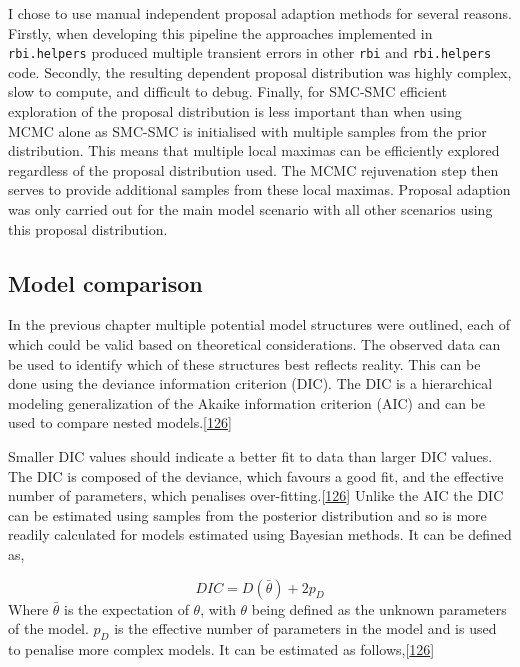 \documentclass[11pt,twoside]{bristolthesis}
\begin{document}
  I chose to use manual independent proposal adaption methods for several reasons. Firstly, when developing this pipeline the approaches implemented in \texttt{rbi.helpers} produced multiple transient errors in other \texttt{rbi} and \texttt{rbi.helpers} code. Secondly, the resulting dependent proposal distribution was highly complex, slow to compute, and difficult to debug. Finally, for SMC-SMC efficient exploration of the proposal distribution is less important than when using MCMC alone as SMC-SMC is initialised with multiple samples from the prior distribution. This means that multiple local maximas can be efficiently explored regardless of the proposal distribution used. The MCMC rejuvenation step then serves to provide additional samples from these local maximas. Proposal adaption was only carried out for the main model scenario with all other scenarios using this proposal distribution.
  
  \hypertarget{model-comparison}{%
  \subsection{Model comparison}\label{model-comparison}}
  
  In the previous chapter multiple potential model structures were outlined, each of which could be valid based on theoretical considerations. The observed data can be used to identify which of these structures best reflects reality. This can be done using the deviance information criterion (DIC). The DIC is a hierarchical modeling generalization of the Akaike information criterion (AIC) and can be used to compare nested models.{[}\protect\hyperlink{ref-Gelman:nll_LBlw}{126}{]}
  
  Smaller DIC values should indicate a better fit to data than larger DIC values. The DIC is composed of the deviance, which favours a good fit, and the effective number of parameters, which penalises over-fitting.{[}\protect\hyperlink{ref-Gelman:nll_LBlw}{126}{]} Unlike the AIC the DIC can be estimated using samples from the posterior distribution and so is more readily calculated for models estimated using Bayesian methods. It can be defined as,
  
  \[ {\mathit  {DIC}}=D({\bar  {\theta }})+2p_{D}\]
  Where \(\bar{\theta}\) is the expectation of \(\theta\), with \(\theta\) being defined as the unknown parameters of the model. \(p_{D}\) is the effective number of parameters in the model and is used to penalise more complex models. It can be estimated as follows,{[}\protect\hyperlink{ref-Gelman:nll_LBlw}{126}{]}
  
\end{document}

